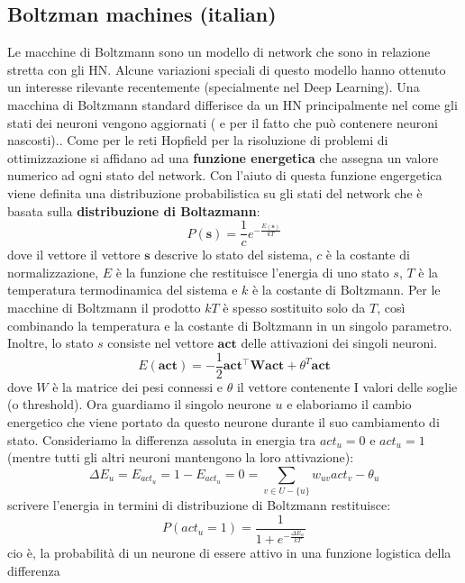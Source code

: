 \documentclass{article}
\begin{document}
\subsection{Boltzman machines (italian)}
Le macchine di Boltzmann sono un modello di network che sono in relazione stretta con gli
HN. Alcune variazioni speciali di questo modello hanno ottenuto un interesse rilevante
recentemente (specialmente nel Deep Learning). Una macchina di Boltzmann standard differisce
da un HN principalmente nel come gli stati dei neuroni vengono aggiornati (
e per il fatto che può contenere neuroni nascosti)..
\newline\newline
Come per le reti Hopfield per la risoluzione di problemi di ottimizzazione si affidano ad
una \textbf{funzione energetica} che assegna un valore numerico ad ogni stato del network. Con
l'aiuto di questa funzione engergetica viene definita una distribuzione probabilistica su gli
stati del network che è basata sulla \textbf{distribuzione di Boltazmann}:
$$P(\textbf{s})=\frac{1}{c}e^{-\frac{E(\textbf{s})}{kT}}$$
dove il vettore il vettore $\textbf{s}$ descrive lo stato del sistema, $c$ è la costante di
normalizzazione, $E$ è la funzione che restituisce l'energia di uno stato $s$, $T$ è la temperatura
termodinamica del sistema e $k$ è la costante di Boltzmann.
\newline\newline
Per le macchine di Boltzmann il prodotto $kT$ è spesso sostituito solo da $T$, così combinando
la temperatura e la costante di Boltzmann in un singolo parametro. Inoltre, lo stato $s$ consiste
nel vettore $\textbf{act}$ delle attivazioni dei singoli neuroni.
$$E(\textbf{act})=-\frac{1}{2}\textbf{act}^\intercal \textbf{W} \textbf{act}+\theta^T \textbf{act}$$
dove $W$ è la matrice dei pesi connessi e $\theta$ il vettore contenente I valori delle soglie (o threshold).
\newline\newline
Ora guardiamo il singolo neurone $u$ e elaboriamo il cambio energetico che viene portato da
questo neurone durante il suo cambiamento di stato. Consideriamo la differenza assoluta in energia
tra $act_u=0$ e $act_u=1$ (mentre tutti gli altri neuroni mantengono la loro attivazione):
$$\Delta E_u=E_{act_u}=1-E_{act_u}=0=\sum_{v\in U-\{u\}}w_{uv}act_v-\theta_u$$
scrivere l'energia in termini di distribuzione di Boltzmann restituisce:
$$P(act_u=1)=\frac{1}{1+e^{-\frac{\Delta E_u}{kT}}}$$
cio è, la probabilità di un neurone di essere attivo in una funzione logistica della differenza
\end{document}

